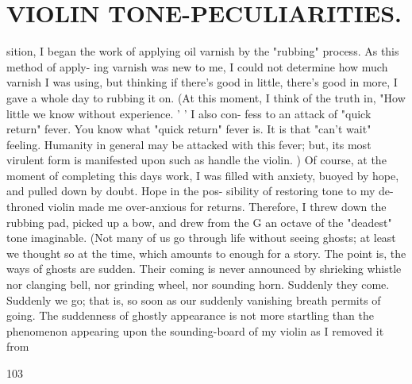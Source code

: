 \documentclass{article}
\begin{document}
\section*{VIOLIN TONE-PECULIARITIES.}
sition, I began the work of applying oil varnish by the "rubbing" process. As this method of apply- ing varnish was new to me, I could not determine how much varnish I was using, but thinking if there's good in little, there's good in more, I gave a whole day to rubbing it on. (At this moment, I think of the truth in, "How little we know without experience. ' ' I also con- fess to an attack of "quick return" fever. You know what "quick return" fever is. It is that "can't wait" feeling. Humanity in general may be attacked with this fever; but, its most virulent form is manifested upon such as handle the violin. ) Of course, at the moment of completing this days work, I was filled with anxiety, buoyed by hope, and pulled down by doubt. Hope in the pos- sibility of restoring tone to my de-throned violin made me over-anxious for returns. Therefore, I threw down the rubbing pad, picked up a bow, and drew from the G an octave of the "deadest" tone imaginable. (Not many of us go through life without seeing ghosts; at least we thought so at the time, which amounts to enough for a story. The point is, the ways of ghosts are sudden. Their coming is never announced by shrieking whistle nor clanging bell, nor grinding wheel, nor sounding horn. Suddenly they come. Suddenly we go; that is, so soon as our suddenly vanishing breath permits of going. The suddenness of ghostly appearance is not more startling than the phenomenon appearing upon the sounding-board of my violin as I removed it from

103
\end{document}
